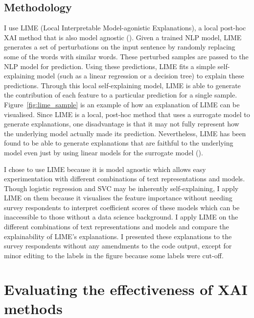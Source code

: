 \subsection{Methodology}
I use LIME (Local Interpretable Model-agonistic Explanations), a local post-hoc XAI method that is also model agnostic (\cite{lime}). Given a trained NLP model, LIME generates a set of perturbations on the input sentence by randomly replacing some of the words with similar words. These perturbed samples are passed to the NLP model for prediction. Using these predictions, LIME fits a simple self-explaining model (such as a linear regression or a decision tree) to explain these predictions. Through this local self-explaining model, LIME is able to generate the contribution of each feature to a particular prediction for a single sample. Figure~\ref{fig:lime_sample} is an example of how an explanation of LIME can be visualised. Since LIME is a local, post-hoc method that uses a surrogate model to generate explanations, one disadvantage is that it may not fully represent how the underlying model actually made its prediction. Nevertheless, LIME has been found to be able to generate explanations that are faithful to the underlying model even just by using linear models for the surrogate model (\cite{lime}).

I chose to use LIME because it is model agnostic which allows easy experimentation with different combinations of text representations and models. Though logistic regression and SVC may be inherently self-explaining, I apply LIME on them because it visualises the feature importance without needing survey respondents to interpret coefficient scores of these models which can be inaccessible to those without a data science background. I apply LIME on the different combinations of text representations and models and compare the explainability of LIME's explanations. I presented these explanations to the survey respondents without any amendments to the code output, except for minor editing to the labels in the figure because some labels were cut-off.

\section{Evaluating the effectiveness of XAI methods}
